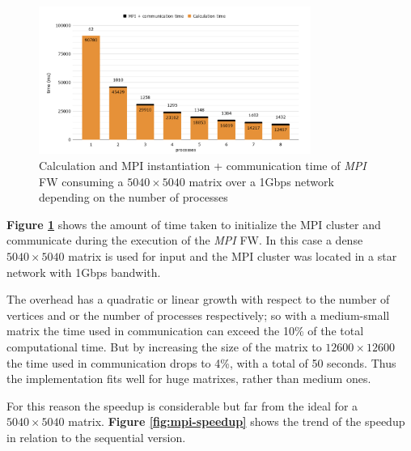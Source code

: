 \begin{figure}[h!]
\centering                                                                        
\includegraphics[width=3.5in]{diagrams/mpi-time}
\captionsetup{justification=centering}                                                                                                                                   
\caption{Calculation and MPI instantiation + communication time of \emph{MPI} FW consuming a $5040\times5040$ matrix over a 1Gbps network depending on the number of processes}
\label{fig:mpi-time}                                                                                                                                                           
\end{figure}

\textbf{Figure \ref*{fig:mpi-time}} shows the amount of time taken to initialize the MPI cluster and communicate during the execution of the \emph{MPI} FW. In this case a dense 
$5040\times5040$ matrix is used for input and the MPI cluster was located in a star network with 1Gbps bandwith.

The overhead has a quadratic or linear growth with respect to the number of vertices and or the number of processes respectively; 
so with a medium-small matrix the time used in communication can exceed the 10\% of the total computational time. 
But by increasing the size of the matrix to $12600\times12600$ the time used in communication drops to 4\%, with a total of 50 seconds. Thus the implementation fits well for huge matrixes, rather than medium ones.

For this reason the speedup is considerable but far from the ideal for a $5040\times5040$ matrix. \textbf{Figure \ref*{fig:mpi-speedup}} shows the trend of the speedup in relation to the 
sequential version.

